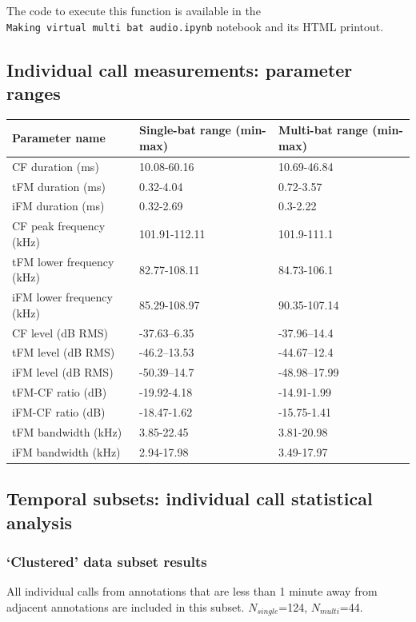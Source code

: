 \documentclass[
]{book}
\begin{document}
The code to execute this function is available in the \texttt{Making\ virtual\ multi\ bat\ audio.ipynb} notebook and its HTML printout.

\hypertarget{indcallparamranges}{%
\subsection{Individual call measurements: parameter ranges}\label{indcallparamranges}}

\begin{longtable}[]{@{}lll@{}}
\toprule
Parameter name & Single-bat range (min-max) & Multi-bat range (min-max)\tabularnewline
\midrule
\endhead
CF duration (ms) & 10.08-60.16 & 10.69-46.84\tabularnewline
tFM duration (ms) & 0.32-4.04 & 0.72-3.57\tabularnewline
iFM duration (ms) & 0.32-2.69 & 0.3-2.22\tabularnewline
CF peak frequency (kHz) & 101.91-112.11 & 101.9-111.1\tabularnewline
tFM lower frequency (kHz) & 82.77-108.11 & 84.73-106.1\tabularnewline
iFM lower frequency (kHz) & 85.29-108.97 & 90.35-107.14\tabularnewline
CF level (dB RMS) & -37.63--6.35 & -37.96--14.4\tabularnewline
tFM level (dB RMS) & -46.2--13.53 & -44.67--12.4\tabularnewline
iFM level (dB RMS) & -50.39--14.7 & -48.98--17.99\tabularnewline
tFM-CF ratio (dB) & -19.92-4.18 & -14.91-1.99\tabularnewline
iFM-CF ratio (dB) & -18.47-1.62 & -15.75-1.41\tabularnewline
tFM bandwidth (kHz) & 3.85-22.45 & 3.81-20.98\tabularnewline
iFM bandwidth (kHz) & 2.94-17.98 & 3.49-17.97\tabularnewline
\bottomrule
\end{longtable}

\hypertarget{subsetsindcall}{%
\subsection{Temporal subsets: individual call statistical analysis}\label{subsetsindcall}}

\hypertarget{clustered-data-subset-results}{%
\subsubsection{`Clustered' data subset results}\label{clustered-data-subset-results}}

All individual calls from annotations that are less than 1 minute away from adjacent annotations are included in this subset. \(N_{single}\)=124, \(N_{multi}\)=44.

\providecommand{\docline}[3]{\noalign{\global\setlength{\arrayrulewidth}{#1}}\arrayrulecolor[HTML]{#2}\cline{#3}}
\end{document}
